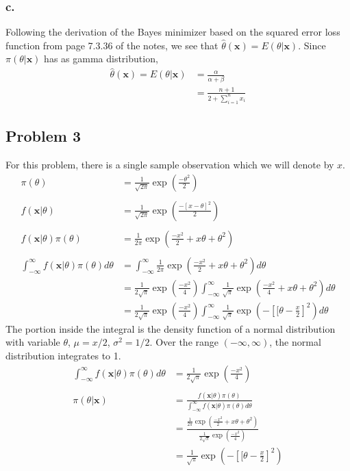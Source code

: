\documentclass{article}
\begin{document}
\subsubsection*{c.}

Following the derivation of the Bayes minimizer based on the squared error loss function from page 7.3.36 of the notes, we see that $\hat{\theta}(\mathbf{x}) = E(\theta|\mathbf{x})$.
Since $\pi(\theta|\mathbf{x})$ has as gamma distribution, 
\begin{align*}
\hat{\theta}(\mathbf{x}) = E(\theta|\mathbf{x}) &= \frac{\alpha}{\alpha + \beta} \\
&= \frac{n+1}{2+\sum_{i=1}^n x_i}
\end{align*}
\subsection*{Problem 3}
For this problem, there is a single sample observation which we will denote by $x$.
\begin{align*}
\pi(\theta) &= \frac{1}{\sqrt{2\pi}}\exp\left(\frac{-\theta^2}{2}\right) \\ \\ 
f(\mathbf{x}|\theta) &= \frac{1}{\sqrt{2\pi}}\exp\left(\frac{-[x-\theta]^2}{2}\right) \\ \\ 
f(\mathbf{x}|\theta)\pi(\theta) &= \frac{1}{2\pi}\exp\left(\frac{-x^2}{2}+x\theta+\theta^2\right) \\ \\
\int_{-\infty}^\infty f(\mathbf{x}|\theta)\pi(\theta) d\theta &= \int_{-\infty}^\infty\frac{1}{2\pi}\exp\left(\frac{-x^2}{2}+x\theta+\theta^2\right)d\theta \\
&=\frac{1}{2\sqrt{\pi}}\exp\left(\frac{-x^2}{4}\right)\int_{-\infty}^\infty \frac{1}{\sqrt{\pi}}\exp\left(\frac{-x^2}{4}+x\theta+\theta^2\right)d\theta \\ 
&=\frac{1}{2\sqrt{\pi}}\exp\left(\frac{-x^2}{4}\right)\int_{-\infty}^\infty \frac{1}{\sqrt{\pi}}\exp\left(-\left[[\theta-\frac{x}{2}\right]^2\right) d\theta
\end{align*}
The portion inside the integral is the density function of a normal distribution with variable $\theta$, $\mu = x/2$, $\sigma^2 = 1/2$. Over the range $(-\infty, \infty)$, the normal distribution integrates to 1. 
\begin{align*}
\int_{-\infty}^\infty f(\mathbf{x}|\theta)\pi(\theta) d\theta &= \frac{1}{2\sqrt{\pi}}\exp\left(\frac{-x^2}{4}\right) \\ \\
\pi(\theta|\mathbf{x}) &= \frac{f(\mathbf{x}|\theta)\pi(\theta)}{\int_{-\infty}^\infty f(\mathbf{x}|\theta)\pi(\theta) d\theta} \\
&= \frac{\frac{1}{2\pi}\exp\left(\frac{-x^2}{2}+x\theta+\theta^2\right)}{\frac{1}{2\sqrt{\pi}}\exp\left(\frac{-x^2}{4}\right)} \\
&=\frac{1}{\sqrt{\pi}}\exp\left(-\left[[\theta-\frac{x}{2}\right]^2\right)
\end{align*}
\end{document}
